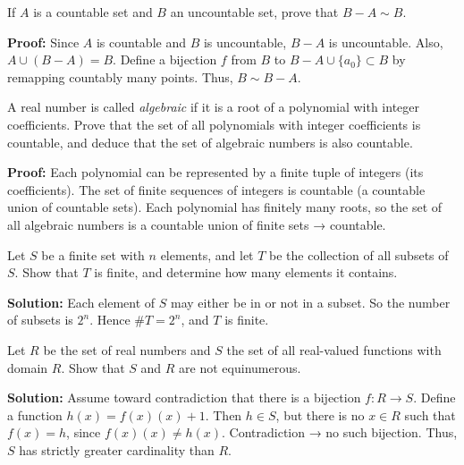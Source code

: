 \begin{problembox}
If \( A \) is a countable set and \( B \) an uncountable set, prove that \( B - A \sim B \).
\end{problembox}

\textbf{Proof:}  
Since \( A \) is countable and \( B \) is uncountable, \( B - A \) is uncountable.  
Also, \( A \cup (B - A) = B \). Define a bijection \( f \) from \( B \) to \( B - A \cup \{a_0\} \subset B \) by remapping countably many points.  
Thus, \( B \sim B - A \).

\begin{problembox}
A real number is called \emph{algebraic} if it is a root of a polynomial with integer coefficients.  
Prove that the set of all polynomials with integer coefficients is countable, and deduce that the set of algebraic numbers is also countable.
\end{problembox}

\textbf{Proof:}  
Each polynomial can be represented by a finite tuple of integers (its coefficients). The set of finite sequences of integers is countable (a countable union of countable sets).  
Each polynomial has finitely many roots, so the set of all algebraic numbers is a countable union of finite sets → countable.


\begin{problembox}
Let \( S \) be a finite set with \( n \) elements, and let \( T \) be the collection of all subsets of \( S \).  
Show that \( T \) is finite, and determine how many elements it contains.
\end{problembox}

\textbf{Solution:}  
Each element of \( S \) may either be in or not in a subset.  
So the number of subsets is \( 2^n \). Hence \( \#T = \textbf{$2^n$} \), and \( T \) is finite.

\begin{problembox}
Let \( R \) be the set of real numbers and \( S \) the set of all real-valued functions with domain \( R \).  
Show that \( S \) and \( R \) are not equinumerous.
\end{problembox}

\textbf{Solution:}  
Assume toward contradiction that there is a bijection \( f: R \to S \).  
Define a function \( h(x) = f(x)(x) + 1 \). Then \( h \in S \), but there is no \( x \in R \) such that \( f(x) = h \), since \( f(x)(x) \ne h(x) \).  
Contradiction → no such bijection. Thus, \( S \) has strictly greater cardinality than \( R \).

